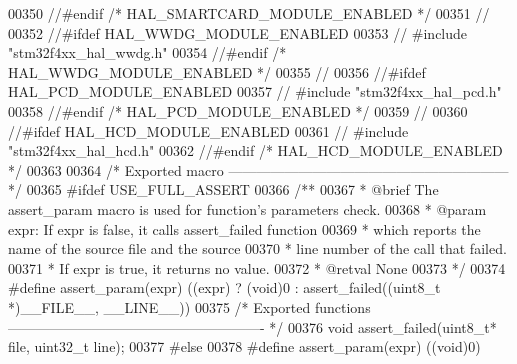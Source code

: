 \begin{DoxyCode}
00350 \textcolor{comment}{//#endif /* HAL\_SMARTCARD\_MODULE\_ENABLED */}
00351 \textcolor{comment}{//}
00352 \textcolor{comment}{//#ifdef HAL\_WWDG\_MODULE\_ENABLED}
00353 \textcolor{comment}{// #include "stm32f4xx\_hal\_wwdg.h"}
00354 \textcolor{comment}{//#endif /* HAL\_WWDG\_MODULE\_ENABLED */}
00355 \textcolor{comment}{//}
00356 \textcolor{comment}{//#ifdef HAL\_PCD\_MODULE\_ENABLED}
00357 \textcolor{comment}{// #include "stm32f4xx\_hal\_pcd.h"}
00358 \textcolor{comment}{//#endif /* HAL\_PCD\_MODULE\_ENABLED */}
00359 \textcolor{comment}{//}
00360 \textcolor{comment}{//#ifdef HAL\_HCD\_MODULE\_ENABLED}
00361 \textcolor{comment}{// #include "stm32f4xx\_hal\_hcd.h"}
00362 \textcolor{comment}{//#endif /* HAL\_HCD\_MODULE\_ENABLED */}
00363 
00364 \textcolor{comment}{/* Exported macro ------------------------------------------------------------*/}
00365 \textcolor{preprocessor}{#}\textcolor{preprocessor}{ifdef}  \textcolor{preprocessor}{USE\_FULL\_ASSERT}
00366 \textcolor{comment}{/**}
00367 \textcolor{comment}{  * @brief  The assert\_param macro is used for function's parameters check.}
00368 \textcolor{comment}{  * @param  expr: If expr is false, it calls assert\_failed function}
00369 \textcolor{comment}{  *         which reports the name of the source file and the source}
00370 \textcolor{comment}{  *         line number of the call that failed. }
00371 \textcolor{comment}{  *         If expr is true, it returns no value.}
00372 \textcolor{comment}{  * @retval None}
00373 \textcolor{comment}{  */}
00374   \textcolor{preprocessor}{#}\textcolor{preprocessor}{define} \textcolor{preprocessor}{assert\_param}\textcolor{preprocessor}{(}\textcolor{preprocessor}{expr}\textcolor{preprocessor}{)} \textcolor{preprocessor}{(}\textcolor{preprocessor}{(}\textcolor{preprocessor}{expr}\textcolor{preprocessor}{)} \textcolor{preprocessor}{?} \textcolor{preprocessor}{(}\textcolor{preprocessor}{void}\textcolor{preprocessor}{)}0 \textcolor{preprocessor}{:} \textcolor{preprocessor}{assert\_failed}\textcolor{preprocessor}{(}\textcolor{preprocessor}{(}\textcolor{preprocessor}{uint8\_t} \textcolor{preprocessor}{*}\textcolor{preprocessor}{)}\textcolor{preprocessor}{\_\_FILE\_\_}\textcolor{preprocessor}{,} \textcolor{preprocessor}{\_\_LINE\_\_}\textcolor{preprocessor}{)}\textcolor{preprocessor}{)}
00375 \textcolor{comment}{/* Exported functions ------------------------------------------------------- */}
00376   \textcolor{keywordtype}{void} assert\_failed(uint8\_t* file, uint32\_t line);
00377 \textcolor{preprocessor}{#}\textcolor{preprocessor}{else}
00378   \textcolor{preprocessor}{#}\textcolor{preprocessor}{define} \textcolor{preprocessor}{assert\_param}\textcolor{preprocessor}{(}\textcolor{preprocessor}{expr}\textcolor{preprocessor}{)} \textcolor{preprocessor}{(}\textcolor{preprocessor}{(}\textcolor{keywordtype}{void}\textcolor{preprocessor}{)}0\textcolor{preprocessor}{)}

\end{DoxyCode}
